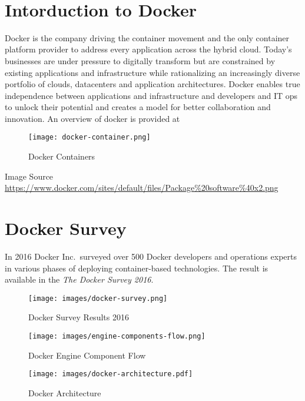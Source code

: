 
\FILENAME\

\section{Intorduction to Docker}
\label{Docker}

Docker is the company driving the container movement and the only
container platform provider to address every application across the
hybrid cloud. Today's businesses are under pressure to digitally
transform but are constrained by existing applications and
infrastructure while rationalizing an increasingly diverse portfolio
of clouds, datacenters and application architectures. Docker enables
true independence between applications and infrastructure and
developers and IT ops to unlock their potential and creates a model
for better collaboration and innovation. An overview of docker is
provided at


\begin{figure}[htbp]
\centering
\texttt{[image: docker-container.png]}
\caption{Docker Containers}
\end{figure}

Image Source
\url{https://www.docker.com/sites/default/files/Package\%20software\%40x2.png}


\section{Docker Survey}

In 2016 Docker Inc.\ surveyed over 500 Docker developers and operations
experts in various phases of deploying container-based
technologies. The result is available in the \textit{The Docker Survey
  2016}.


\begin{figure}[htb]
\centering
\texttt{[image: images/docker-survey.png]}
\caption{Docker Survey Results 2016
}
\end{figure}


\begin{figure}[htb]
\centering
\texttt{[image: images/engine-components-flow.png]}
\caption{ Docker Engine Component Flow }
\end{figure}

\begin{figure}[htb]
\centering
\texttt{[image: images/docker-architecture.pdf]}
\caption{ Docker Architecture }
\end{figure}

